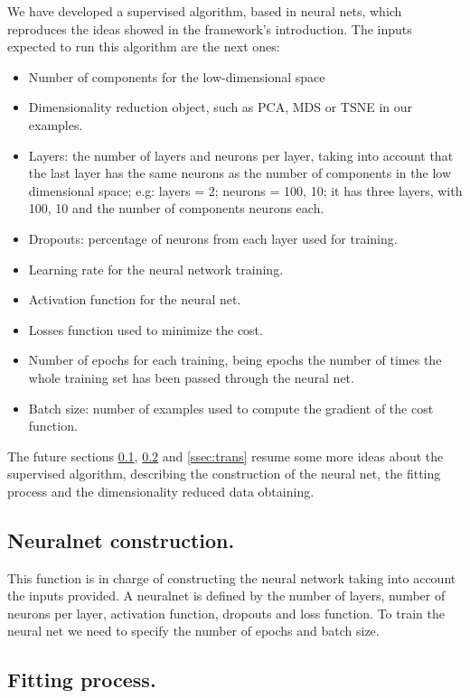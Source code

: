 \documentclass[a4paper,11pt,spanish]{report}
\begin{document}
We have developed a supervised algorithm, based in neural nets, which reproduces the ideas showed in the framework's introduction.
The inputs expected to run this algorithm are the next ones:

\begin{itemize}
\item Number of components for the low-dimensional space
\item Dimensionality reduction object, such as PCA, MDS or TSNE in our examples.
\item Layers: the number of layers and neurons per layer, taking into account that the last layer has the same neurons as the number of components in the low dimensional space; e.g: layers = 2; neurons = 100, 10; it has three layers, with 100, 10 and the number of components neurons each.
\item Dropouts: percentage of neurons from each layer used for training.
\item Learning rate for the neural network training.
\item Activation function for the neural net.
\item Losses function used to minimize the cost.
\item Number of epochs for each training, being epochs the number of times the whole training set has been passed through the neural net.
\item Batch size: number of examples used to compute the gradient of the cost function.
\end{itemize}

The future sections \ref{ssec:nnc}, \ref{ssec:fit} and \ref{ssec:trans} resume some more ideas about the supervised algorithm, describing the construction of the neural net, the fitting process and the dimensionality reduced data obtaining.

\subsection{Neuralnet construction.}
\label{ssec:nnc}

This function is in charge of constructing the neural network taking into account the inputs provided. A neuralnet is defined by the number of layers, number of neurons per layer, activation function, dropouts and loss function. To train the neural net we need to specify the number of epochs and batch size.

\subsection{Fitting process.}
\label{ssec:fit}
\end{document}
